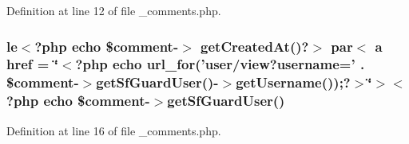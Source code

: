 Definition at line 12 of file \-\_\-comments.\-php.

\hypertarget{frontend_2modules_2comment_2templates_2__comments_8php_a4dd7f607c7b5683f1ebb8f4b4260ec6d}{
\subsubsection[{get\-Created\-At}]{\setlength{\rightskip}{0pt plus 5cm}le$<$?php echo \$comment-\/$>$ get\-Created\-At()?$>$ par$<$ a href = \char`\"{}$<$?php echo url\-\_\-for('user/view?username=' . \$comment-\/$>$get\-Sf\-Guard\-User()-\/$>$get\-Username());?$>$\char`\"{}$>$$<$?php echo \$comment-\/$>$get\-Sf\-Guard\-User()}}\label{frontend_2modules_2comment_2templates_2__comments_8php_a4dd7f607c7b5683f1ebb8f4b4260ec6d}


Definition at line 16 of file \-\_\-comments.\-php.

